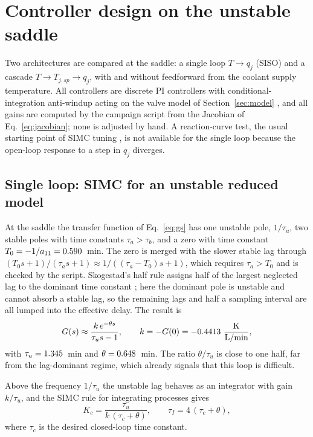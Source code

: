 \section{Controller design on the unstable saddle}
\label{sec:design}

Two architectures are compared at the saddle: a single loop $T\rightarrow q_j$ (SISO) and a cascade $T\rightarrow T_{j,sp}\rightarrow q_j$, with and without feedforward from the coolant supply temperature. All controllers are discrete PI controllers with conditional-integration anti-windup acting on the valve model of Section~\ref{sec:model} \cite{astrom2006pid,astrom1995pid,odwyer2009handbook,tarbouriech2009antiwindup}, and all gains are computed by the campaign script from the Jacobian of Eq.~\eqref{eq:jacobian}; none is adjusted by hand. A reaction-curve test, the usual starting point of SIMC tuning \cite{skogestad2003simple,grimholt2018optimal}, is not available for the single loop because the open-loop response to a step in $q_j$ diverges.

\subsection{Single loop: SIMC for an unstable reduced model}
\label{subsec:siso_design}
At the saddle the transfer function of Eq.~\eqref{eq:gs} has one unstable pole, $1/\tau_u$, two stable poles with time constants $\tau_a>\tau_b$, and a zero with time constant $T_0=-1/a_{11}=0.590$~min. The zero is merged with the slower stable lag through $(T_0s+1)/(\tau_as+1)\approx 1/((\tau_a-T_0)s+1)$, which requires $\tau_a>T_0$ and is checked by the script. Skogestad's half rule assigns half of the largest neglected lag to the dominant time constant \cite{skogestad2003simple,rivera1986internal}; here the dominant pole is unstable and cannot absorb a stable lag, so the remaining lags and half a sampling interval are all lumped into the effective delay. The result is
\begin{equation}
G(s)\approx \frac{k\,e^{-\theta s}}{\tau_us-1},\qquad k=-G(0)=-0.4413~\frac{\text{K}}{\text{L/min}},
\label{eq:unstable_model}
\end{equation}
with $\tau_u=1.345$~min and $\theta=0.648$~min. The ratio $\theta/\tau_u$ is close to one half, far from the lag-dominant regime, which already signals that this loop is difficult.

Above the frequency $1/\tau_u$ the unstable lag behaves as an integrator with gain $k/\tau_u$, and the SIMC rule for integrating processes \cite{skogestad2003simple,alcantara2013simple} gives
\begin{equation}
K_c=\frac{\tau_u}{k\,(\tau_c+\theta)},\qquad \tau_I=4\,(\tau_c+\theta),
\label{eq:simc_unstable}
\end{equation}
where $\tau_c$ is the desired closed-loop time constant.

